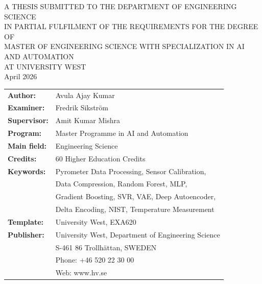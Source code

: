 \newpage
\thispagestyle{empty}
\begin{center}
\vspace*{2cm}
{\small A THESIS SUBMITTED TO THE DEPARTMENT OF ENGINEERING SCIENCE\\
IN PARTIAL FULFILMENT OF THE REQUIREMENTS FOR THE DEGREE OF\\
MASTER OF ENGINEERING SCIENCE WITH SPECIALIZATION IN AI AND AUTOMATION\\
AT UNIVERSITY WEST}\\[2cm]

{\large April 2026}\\[1cm]

\begin{tabular}{ll}
\textbf{Author:}     & Avula Ajay Kumar\\[0.5cm]
\textbf{Examiner:}   & Fredrik Sikstr\"{o}m\\[0.5cm]
\textbf{Supervisor:} & Amit Kumar Mishra\\[0.5cm]
\textbf{Program:}    & Master Programme in AI and Automation\\[0.5cm]
\textbf{Main field:} & Engineering Science\\[0.5cm]
\textbf{Credits:}    & 60 Higher Education Credits\\[0.5cm]
\textbf{Keywords:}   & Pyrometer Data Processing, Sensor Calibration,\\
                     & Data Compression, Random Forest, MLP,\\
                     & Gradient Boosting, SVR, VAE, Deep Autoencoder,\\
                     & Delta Encoding, NIST, Temperature Measurement\\[0.5cm]
\textbf{Template:}   & University West, EXA620\\[0.5cm]
\textbf{Publisher:}  & University West, Department of Engineering Science\\
                     & S-461 86 Trollh\"{a}ttan, SWEDEN\\
                     & Phone: +46 520 22 30 00\\
                     & Web: www.hv.se
\end{tabular}
\end{center}
\clearpage
